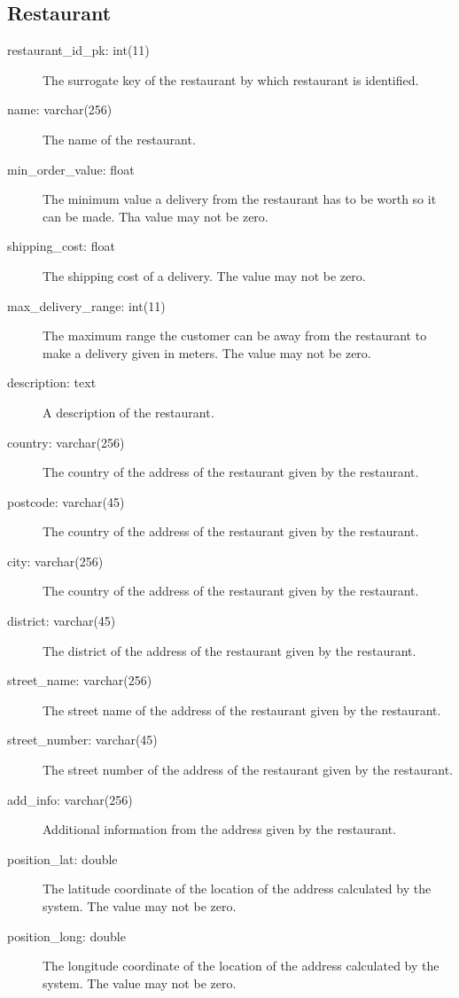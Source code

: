     \subsection{Restaurant}
    \begin{description}
        \item[restaurant\_id\_pk: int(11)] The surrogate key of the restaurant by which restaurant is identified.
        \item[name: varchar(256)] The name of the restaurant.
        \item[min\_order\_value: float] The minimum value a delivery from the restaurant has to be worth so it can be made. Tha value may not be zero.
        \item[shipping\_cost: float] The shipping cost of a delivery. The value may not be zero.
        \item[max\_delivery\_range: int(11)] The maximum range the customer can be away from the restaurant to make a delivery given in meters. The value may not be zero.
        \item[description: text] A description of the restaurant.
        \item[country: varchar(256)] The country of the address of the restaurant given by the restaurant.
        \item[postcode: varchar(45)] The country of the address of the restaurant given by the restaurant.
        \item[city: varchar(256)] The country of the address of the restaurant given by the restaurant.
        \item[district: varchar(45)] The district of the address of the restaurant given by the restaurant.
        \item[street\_name: varchar(256)]The street name of the address of the restaurant given by the restaurant.
        \item[street\_number: varchar(45)]The street number of the address of the restaurant given by the restaurant.
        \item[add\_info: varchar(256)] Additional information from the address given by the restaurant.
        \item[position\_lat: double] The latitude coordinate of the location of the address calculated by the system. The value may not be zero.
        \item[position\_long: double] The longitude coordinate of the location of the address calculated by the system. The value may not be zero.

\end{description}
